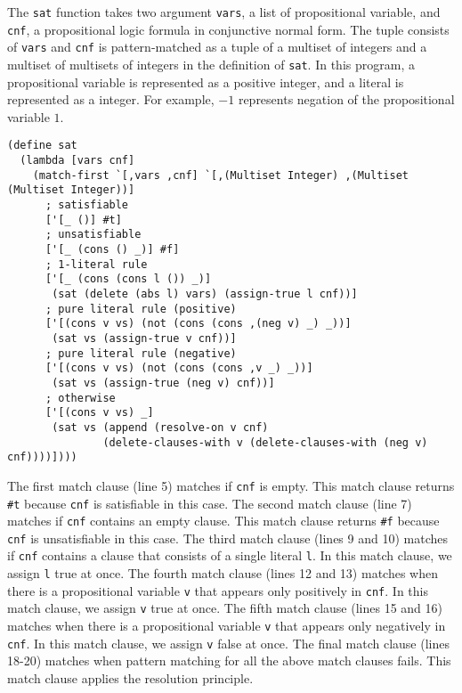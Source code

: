 \documentclass[acmlarge]{acmart}
\newcommand{\new}[1]{\textcolor{blue}{#1}}
\begin{document}
The \lstinline{sat} function takes two argument \lstinline{vars}, a list of propositional variable, and \lstinline{cnf}, a propositional logic formula in conjunctive normal form.
The tuple consists of \lstinline{vars} and \lstinline{cnf} is pattern-matched as a tuple of a multiset of integers and a multiset of multisets of integers in the definition of \lstinline{sat}.
In this program, a propositional variable is represented as a positive integer, and a literal is represented as a integer.
For example, $-1$ represents negation of the propositional variable $1$.

\begin{lstlisting}[language=egison]
(define sat
  (lambda [vars cnf]
    (match-first `[,vars ,cnf] `[,(Multiset Integer) ,(Multiset (Multiset Integer))]
      ; satisfiable
      ['[_ ()] #t]
      ; unsatisfiable
      ['[_ (cons () _)] #f]
      ; 1-literal rule
      ['[_ (cons (cons l ()) _)]
       (sat (delete (abs l) vars) (assign-true l cnf))]
      ; pure literal rule (positive)
      ['[(cons v vs) (not (cons (cons ,(neg v) _) _))]
       (sat vs (assign-true v cnf))]
      ; pure literal rule (negative)
      ['[(cons v vs) (not (cons (cons ,v _) _))]
       (sat vs (assign-true (neg v) cnf))]
      ; otherwise
      ['[(cons v vs) _]
       (sat vs (append (resolve-on v cnf)
               (delete-clauses-with v (delete-clauses-with (neg v) cnf))))])))
\end{lstlisting}

\noindent
The first match clause (line 5) matches if \lstinline{cnf} is empty.
This match clause returns \lstinline{#t} because \lstinline{cnf} is satisfiable in this case.
The second match clause (line 7) matches if \lstinline{cnf} contains an empty clause.
This match clause returns \lstinline{#f} because \lstinline{cnf} is unsatisfiable in this case.
The third match clause (lines 9 and 10) matches if \lstinline{cnf} contains a clause that consists of a single literal \lstinline{l}.
In this match clause, we assign \lstinline{l} true at once.
The fourth match clause (lines 12 and 13) matches when there is a propositional variable \lstinline{v} that appears only positively in \lstinline{cnf}.
In this match clause, we assign \lstinline{v} true at once.
The fifth match clause (lines 15 and 16) matches when there is a propositional variable \lstinline{v} that appears only negatively in \lstinline{cnf}.
In this match clause, we assign \lstinline{v} false at once.
The final match clause (lines 18-20) matches when pattern matching for all the above match clauses fails.
This match clause applies the resolution principle.
\end{document}
